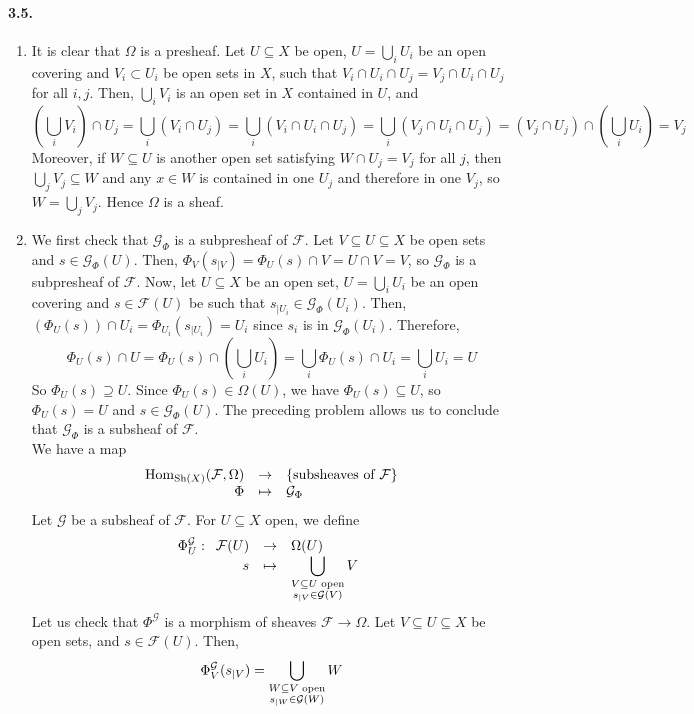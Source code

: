 \documentclass{article}
\newcommand{\F}{\mathcal{F}}
\newcommand{\G}{\mathcal{G}}
\DeclareMathOperator{\Sh}{Sh}
\DeclareMathOperator{\Hom}{Hom}
\newcommand{\applic}[4]{\begin{array}[t]{rcl}
#1 & \to & #2 \\
#3 & \mapsto & #4
\end{array}}
\begin{document}
\paragraph{3.5.} \begin{enumerate}
    \item It is clear that $\Omega$ is a presheaf. Let $U \subseteq X$ be open, $U = \bigcup_i U_i$ be an open covering and $V_i \subset U_i$ be open sets in $X$, such that $V_i \cap U_i \cap U_j = V_j \cap U_i \cap U_j$ for all $i,j$. Then, $\bigcup_i V_i$ is an open set in $X$ contained in $U$, and
    \[\left( \bigcup_i V_i \right) \cap U_j = \bigcup_i (V_i \cap U_j) = \bigcup_i (V_i \cap U_i \cap U_j) = \bigcup_i (V_j \cap U_i \cap U_j) = (V_j \cap U_j) \cap \left(\bigcup_i U_i \right) = V_j \]
    Moreover, if $W \subseteq U$ is another open set satisfying $W \cap U_j = V_j$ for all $j$, then $\bigcup_j V_j \subseteq W$ and any $x \in W$ is contained in one $U_j$ and therefore in one $V_j$, so $W = \bigcup_j V_j$. Hence $\Omega$ is a sheaf.
    \item We first check that $\G_\Phi$ is a subpresheaf of $\F$. Let $V\subseteq U \subseteq X$ be open sets and $s \in \G_\Phi(U)$. Then, $\Phi_V (s_{\mid V}) = \Phi_U(s) \cap V = U \cap V = V$, so $\G_\Phi$ is a subpresheaf of $\F$. Now, let $U \subseteq X$ be an open set, $U = \bigcup_i U_i$ be an open covering and $s \in \F(U)$ be such that $s_{\mid U_i} \in \G_\Phi(U_i)$. Then, $(\Phi_U (s)) \cap U_i = \Phi_{U_i} (s_{\mid U_i}) = U_i$ since $s_i$ is in $\G_\Phi (U_i)$. Therefore,
    \[\Phi_U (s) \cap U = \Phi_U(s) \cap \left(\bigcup_i U_i\right) = \bigcup_i \Phi_U (s) \cap U_i = \bigcup_i U_i = U\]
    So $\Phi_U (s) \supseteq U$. Since $\Phi_U (s) \in \Omega(U)$, we have $\Phi_U(s) \subseteq U$, so $\Phi_U (s) = U$ and $s \in \G_\Phi(U)$. The preceding problem allows us to conclude that $\G_\Phi$ is a subsheaf of $\F$. \\
    We have a map
    \[\applic{\Hom_{\Sh(X)}(\F,\Omega)}{\{\text{subsheaves of $\F$}\}}{\Phi}{\G_\Phi}\]
    Let $\G$ be a subsheaf of $\F$. For $U \subseteq X$ open, we define
    \[\Phi^\G_U : \applic{\F(U)}{\Omega(U)}{s}{\displaystyle \bigcup_{\begin{subarray}{c} V \subseteq U \text{ open} \\ s_{\mid V} \in \G(V) \end{subarray}} V}\]
    Let us check that $\Phi^\G$ is a morphism of sheaves $\F \to \Omega$. Let $V \subseteq U \subseteq X$ be open sets, and $s \in \F(U)$. Then,
    \[\Phi^\G_V (s_{\mid V}) = \bigcup_{\begin{subarray}{c} W \subseteq V \text{ open} \\ s_{\mid W} \in \G(W) \end{subarray}} W\]

\end{enumerate}
\end{document}
